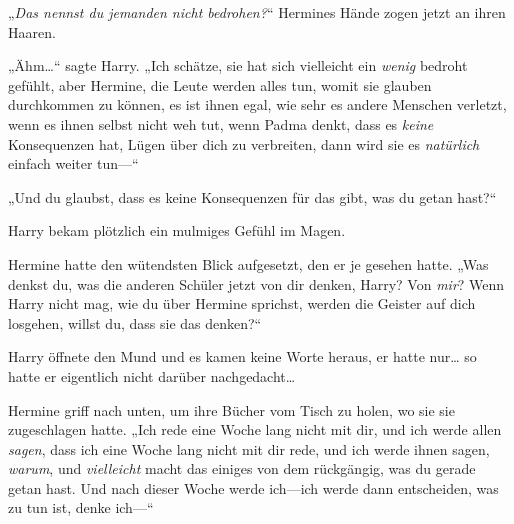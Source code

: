 „\emph{Das nennst du jemanden nicht bedrohen?}“ Hermines Hände zogen jetzt an ihren Haaren.

„Ähm…“ sagte Harry. „Ich schätze, sie hat sich vielleicht ein \emph{wenig} bedroht gefühlt, aber Hermine, die Leute werden alles tun, womit sie glauben durchkommen zu können, es ist ihnen egal, wie sehr es andere Menschen verletzt, wenn es ihnen selbst nicht weh tut, wenn Padma denkt, dass es \emph{keine} Konsequenzen hat, Lügen über dich zu verbreiten, dann wird sie es \emph{natürlich} einfach weiter tun—“

„Und du glaubst, dass es keine Konsequenzen für das gibt, was du getan hast?“

Harry bekam plötzlich ein mulmiges Gefühl im Magen.

Hermine hatte den wütendsten Blick aufgesetzt, den er je gesehen hatte. „Was denkst du, was die anderen Schüler jetzt von dir denken, Harry? Von \emph{mir}? Wenn Harry nicht mag, wie du über Hermine sprichst, werden die Geister auf dich losgehen, willst du, dass sie das denken?“

Harry öffnete den Mund und es kamen keine Worte heraus, er hatte nur… so hatte er eigentlich nicht darüber nachgedacht…

Hermine griff nach unten, um ihre Bücher vom Tisch zu holen, wo sie sie zugeschlagen hatte. „Ich rede eine Woche lang nicht mit dir, und ich werde allen \emph{sagen}, dass ich eine Woche lang nicht mit dir rede, und ich werde ihnen sagen, \emph{warum}, und \emph{vielleicht} macht das einiges von dem rückgängig, was du gerade getan hast. Und nach dieser Woche werde ich—ich werde dann entscheiden, was zu tun ist, denke ich—“

